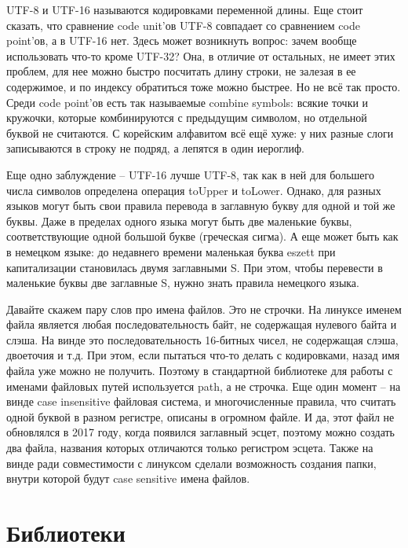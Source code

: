 \documentclass[12pt, a4paper]{article}
\begin{document}
\par UTF-8 и UTF-16 называются кодировками переменной длины. Еще стоит сказать, что сравнение code unit'ов UTF-8 совпадает со сравнением code point'ов, а в UTF-16 нет. Здесь может возникнуть вопрос: зачем вообще использовать что-то кроме UTF-32? Она, в отличие от остальных, не имеет этих проблем, для нее можно быстро посчитать длину строки, не залезая в ее содержимое, и по индексу обратиться тоже можно быстрее. Но не всё так просто. Среди code point'ов есть так называемые combine symbols: всякие точки и кружочки, которые комбинируются с предыдущим символом, но отдельной буквой не считаются. С корейским алфавитом всё ещё хуже: у них разные слоги записываются в строку не подряд, а лепятся в один иероглиф.
\par Еще одно заблуждение -- UTF-16 лучше UTF-8, так как в ней для большего числа символов определена операция toUpper и toLower. Однако, для разных языков могут быть свои правила перевода в заглавную букву для одной и той же буквы. Даже в пределах одного языка могут быть две маленькие буквы, соответствующие одной большой букве (греческая сигма). А еще может быть как в немецком языке: до недавнего времени маленькая буква eszett при капитализации становилась двумя заглавными S. При этом, чтобы перевести в маленькие буквы две заглавные S, нужно знать правила немецкого языка.\\
\par Давайте скажем пару слов про имена файлов. Это не строчки. На линуксе именем файла является любая последовательность байт, не содержащая нулевого байта и слэша. На винде это последовательность 16-битных чисел, не содержащая слэша, двоеточия и т.д. При этом, если пытаться что-то делать с кодировками, назад имя файла уже можно не получить. Поэтому в стандартной библиотеке для работы с именами файловых путей используется path, а не строчка. Еще один момент -- на винде case insensitive файловая система, и многочисленные правила, что считать одной буквой в разном регистре, описаны в огромном файле. И да, этот файл не обновлялся в 2017 году, когда появился заглавный эсцет, поэтому можно создать два файла, названия которых отличаются только регистром эсцета. Также на винде ради совместимости с линуксом сделали возможность создания папки, внутри которой будут case sensitive имена файлов.
\section{Библиотеки}
\end{document}
